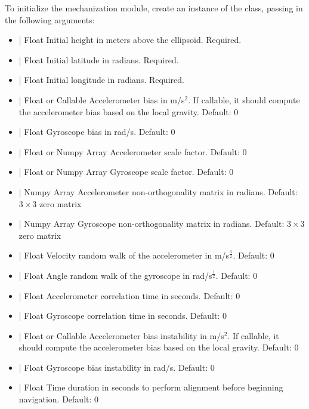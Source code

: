 \documentclass[11pt, oneside]{article}   	%
\begin{document}
To initialize the mechanization module, create an instance of the  class, passing in the following arguments:
\begin{itemize}
	\item {} | Float \newline Initial height in meters above the ellipsoid. Required.
	\item {} | Float \newline Initial latitude in radians. Required.
	\item {} | Float \newline Initial longitude in radians. Required.
	\item {} | Float or Callable \newline Accelerometer bias in m/s$^2$. If callable, it should compute the accelerometer bias based on the local gravity. Default: 0
	\item {} | Float \newline Gyroscope bias in rad/s. Default: 0
	\item {} | Float or Numpy Array \newline Accelerometer scale factor. Default: 0
	\item {} | Float or Numpy Array \newline Gyroscope scale factor. Default: 0
	\item {} | Numpy Array \newline Accelerometer non-orthogonality matrix in radians. Default: $3\times3$ zero matrix
	\item {} | Numpy Array \newline Gyroscope non-orthogonality matrix in radians. Default: $3\times3$ zero matrix
	\item {} | Float \newline Velocity random walk of the accelerometer in m/s$^\frac32$. Default: 0
	\item {} | Float \newline Angle random walk of the gyroscope in rad/s$^\frac12$. Default: 0
	\item {} | Float \newline Accelerometer correlation time in seconds. Default: 0
	\item {} | Float \newline Gyroscope correlation time in seconds. Default: 0
	\item {} | Float or Callable \newline Accelerometer bias instability in m/s$^2$. If callable, it should compute the accelerometer bias based on the local gravity. Default: 0
	\item {} | Float \newline Gyroscope bias instability in rad/s. Default: 0
	\item {} | Float \newline Time duration in seconds to perform alignment before beginning navigation. Default: 0
\end{itemize}
\end{document}
